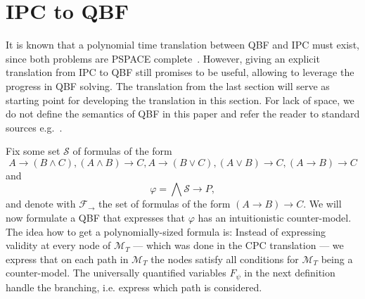 \documentclass[runningheads]{llncs}
\begin{document}
\section{IPC to QBF}

It is known that a polynomial time translation between QBF and IPC must exist, since both problems are PSPACE complete~\cite{garey1979computers,statman1979intuitionistic}.
However, giving an explicit translation from IPC to QBF still promises to be useful, allowing to leverage the progress in QBF solving.
The translation from the last section will serve as starting point for developing the translation in this section.
For lack of space, we do not define the semantics of QBF in this paper and refer the reader to standard sources e.g.~\cite{series/faia/2009-185}.

Fix some set $\mathcal S$ of formulas of the form $$A\to (B\wedge C), (A\wedge B)\to C, A\to (B\vee C), (A\vee B)\to C, (A\to B)\to C$$and$$\varphi = \bigwedge \mathcal S\to P,$$
and denote with $\mathcal F_\to$ the set of formulas of the form $(A\to B)\to C$. We will now formulate a QBF that expresses that $\varphi$ has an intuitionistic counter-model. The idea how to get a polynomially-sized formula is: Instead of expressing validity at every node of $\mathcal M_T$ --- which was done in the CPC translation --- we express that on each path in $\mathcal M_T$ the nodes satisfy all conditions for $\mathcal M_T$ being a counter-model. The universally quantified variables $F_\psi$ in the next definition handle the branching, i.e. express which path is considered.
\end{document}
